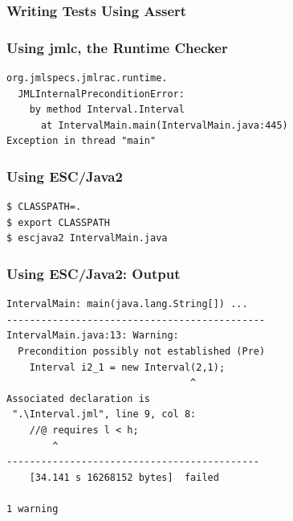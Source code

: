 \begin{frame}[fragile]
\frametitle{Writing Tests Using Assert}


\end{frame}

\begin{frame}[fragile]
\frametitle{Using jmlc, the Runtime Checker}

{\small
\begin{verbatim}
org.jmlspecs.jmlrac.runtime.
  JMLInternalPreconditionError:
    by method Interval.Interval
      at IntervalMain.main(IntervalMain.java:445)
Exception in thread "main" 
\end{verbatim}
}

\end{frame}

\begin{frame}[fragile]
\frametitle{Using ESC/Java2}

\begin{example}
\begin{verbatim}
$ CLASSPATH=.
$ export CLASSPATH
$ escjava2 IntervalMain.java
\end{verbatim}
\end{example}
\end{frame}

\begin{frame}[fragile]
\frametitle{Using ESC/Java2: Output}

{\small
\begin{verbatim}
IntervalMain: main(java.lang.String[]) ...
---------------------------------------------
IntervalMain.java:13: Warning:
  Precondition possibly not established (Pre)
    Interval i2_1 = new Interval(2,1);
                                ^
Associated declaration is 
 ".\Interval.jml", line 9, col 8:
    //@ requires l < h;
        ^
--------------------------------------------
    [34.141 s 16268152 bytes]  failed

1 warning
\end{verbatim}
}
\end{frame}


